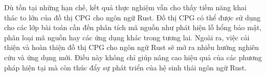 Dù tồn tại những hạn chế, kết quả thực nghiệm vẫn cho thấy tiềm năng khai thác to lớn của đồ thị CPG cho ngôn ngữ Rust.
Đồ thị CPG có thể được sử dụng cho các lớp bài toán cần đến phân tích mã nguồn như phát hiện lỗ hổng bảo mật, phân loại mã nguồn hay các ứng dụng khác trong tương lai.
Ngoài ra, việc cải thiện và hoàn thiện đồ thị CPG cho ngôn ngữ Rust sẽ mở ra nhiều hướng nghiên cứu và ứng dụng mới.
Điều này không chỉ giúp nâng cao hiệu quả của các phương pháp hiện tại mà còn thúc đẩy sự phát triển của hệ sinh thái ngôn ngữ Rust.
